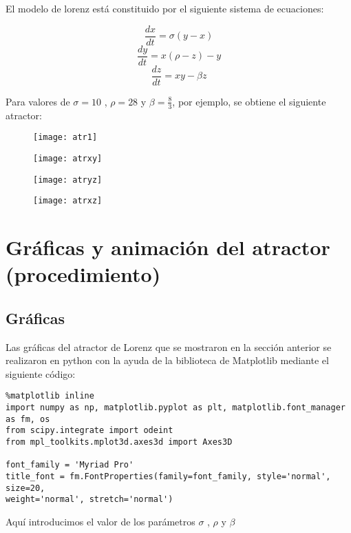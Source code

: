 \documentclass[12pt]{article}
\begin{document}
El modelo de lorenz está constituido por el siguiente sistema de ecuaciones: 

$$\frac{dx}{dt}=\sigma (y-x) $$
$$\frac{dy}{dt}=x(\rho-z)-y $$
$$\frac{dz}{dt}=xy-\beta z$$

\pagebreak

Para valores de $\sigma=10$ , $\rho=28$ y $\beta=\frac{8}{3}$, por ejemplo, se obtiene el siguiente atractor:

\begin{figure}[ht]
\texttt{[image: atr1]}
\centering
\end{figure}

\pagebreak
\begin{figure}[ht]
\texttt{[image: atrxy]}
\centering
\end{figure}
\begin{figure}[ht]
\texttt{[image: atryz]}
\centering
\end{figure}
\newpage 
\begin{figure}[ht]
\texttt{[image: atrxz]}
\centering
\end{figure}

\section*{Gráficas y animación del atractor (procedimiento)}

 \subsection*{Gráficas}

Las gráficas del atractor de Lorenz que se mostraron en la sección anterior se realizaron en python con la ayuda de la biblioteca de Matplotlib mediante el siguiente código:

\begin{verbatim}
%matplotlib inline
import numpy as np, matplotlib.pyplot as plt, matplotlib.font_manager as fm, os
from scipy.integrate import odeint
from mpl_toolkits.mplot3d.axes3d import Axes3D

font_family = 'Myriad Pro'
title_font = fm.FontProperties(family=font_family, style='normal', size=20, 
weight='normal', stretch='normal')
\end{verbatim}

Aquí introducimos el valor de los parámetros  $\sigma$ , $\rho$ y $\beta$
\end{document}
